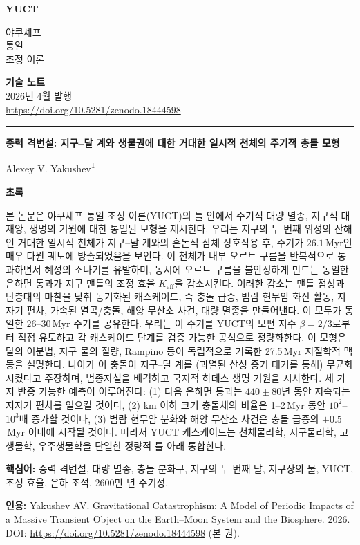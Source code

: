 \documentclass[12pt,a4paper]{article}
\newcommand{\makeheader}{%
	\noindent
	\begin{minipage}{0.17\textwidth}
		\raggedright
		{\sffamily\bfseries\color{skyblue}\fontsize{46}{46}\selectfont YUCT}%
	\end{minipage}%
	\hspace{30pt}
	\begin{minipage}{0.32\textwidth}
		\raggedright
		{\sffamily\fontsize{11}{13}\selectfont 야쿠셰프\\ 통일\\ 조정 이론}%
	\end{minipage}%
	\hfill
	\begin{minipage}{0.38\textwidth}
		\raggedleft
		{\sffamily\bfseries 기술 노트}\\ 
		{\sffamily 2026년 4월 발행}\\ 
		{\sffamily\footnotesize \scriptsize\url{https://doi.org/10.5281/zenodo.18444598}}%
	\end{minipage}
	\par\vspace{5pt}
	\noindent\textcolor{gold}{\rule{\textwidth}{1.6pt}}
	\par\vspace{0pt}
}
\begin{document}
	\thispagestyle{firstpage}
	\makeheader
	
	\vspace{0cm}
	{\LARGE\bfseries 중력 격변설: 지구–달 계와 생물권에 대한 거대한 일시적 천체의 주기적 충돌 모형 \par}
	\vspace{0.2cm}
	
	{\large Alexey V. Yakushev\textsuperscript{1}} \\
	\vspace{0.0cm}
	
	{\color{darkblue}\textbf{\LARGE 초록}} \par
	{\large
		\noindent
		본 논문은 야쿠셰프 통일 조정 이론(YUCT)의 틀 안에서 주기적 대량 멸종, 지구적 대재앙, 생명의 기원에 대한 통일된 모형을 제시한다. 우리는 지구의 두 번째 위성의 잔해인 거대한 일시적 천체가 지구–달 계와의 혼돈적 삼체 상호작용 후, 주기가 \(26.1\) Myr인 매우 타원 궤도에 방출되었음을 보인다. 이 천체가 내부 오르트 구름을 반복적으로 통과하면서 혜성의 소나기를 유발하며, 동시에 오르트 구름을 불안정하게 만드는 동일한 은하면 통과가 지구 맨틀의 조정 효율 \(K_{\mathrm{eff}}\)을 감소시킨다. 이러한 감소는 맨틀 점성과 단층대의 마찰을 낮춰 동기화된 캐스케이드, 즉 충돌 급증, 범람 현무암 화산 활동, 지자기 편차, 가속된 열곡/충돌, 해양 무산소 사건, 대량 멸종을 만들어낸다. 이 모두가 동일한 \(26\)–\(30\) Myr 주기를 공유한다. 우리는 이 주기를 YUCT의 보편 지수 \(\beta = 2/3\)로부터 직접 유도하고 각 캐스케이드 단계를 검증 가능한 공식으로 정량화한다. 이 모형은 달의 이분법, 지구 물의 질량, Rampino 등이 독립적으로 기록한 27.5 Myr 지질학적 맥동을 설명한다. 나아가 이 충돌이 지구–달 계를 (과열된 산성 증기 대기를 통해) 무균화시켰다고 주장하며, 범종자설을 배격하고 국지적 하데스 생명 기원을 시사한다. 세 가지 반증 가능한 예측이 이루어진다: (1) 다음 은하면 통과는 \(440 \pm 80\)년 동안 지속되는 지자기 편차를 일으킬 것이다, (2) km 이하 크기 충돌체의 비율은 1–2 Myr 동안 \(10^{2}\)–\(10^{3}\)배 증가할 것이다, (3) 범람 현무암 분화와 해양 무산소 사건은 충돌 급증의 \(\pm 0.5\) Myr 이내에 시작될 것이다. 따라서 YUCT 캐스케이드는 천체물리학, 지구물리학, 고생물학, 우주생물학을 단일한 정량적 틀 아래 통합한다.}
	
	\vspace{0.1cm}
	\noindent
	{\color{darkblue}\textbf{핵심어:}} 중력 격변설, 대량 멸종, 충돌 분화구, 지구의 두 번째 달, 지구상의 물, YUCT, 조정 효율, 은하 조석, 2600만 년 주기성.
	
	\vspace{0.1cm}
	\noindent
	{\color{darkblue}\textbf{인용:}} Yakushev AV. Gravitational Catastrophism: A Model of Periodic Impacts of a Massive Transient Object on the Earth–Moon System and the Biosphere. 2026. DOI: \url{https://doi.org/10.5281/zenodo.18444598} (본 권).
	
\end{document}
